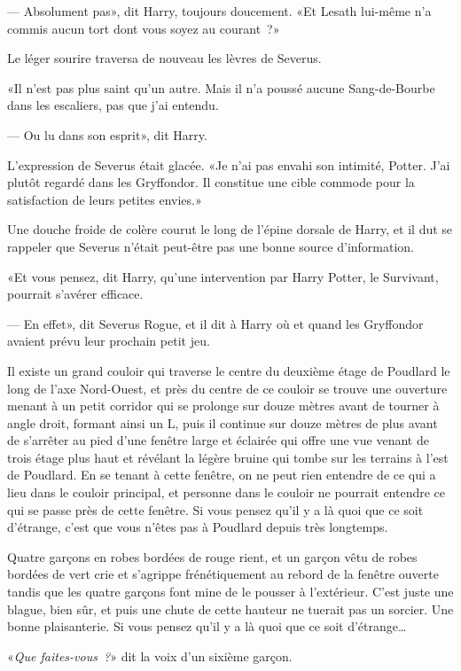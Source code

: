 --- Absolument pas», dit Harry, toujours doucement. «Et Lesath lui-même n'a commis aucun tort dont vous soyez au courant~?»

Le léger sourire traversa de nouveau les lèvres de Severus.

«Il n'est pas plus saint qu'un autre. Mais il n'a poussé aucune Sang-de-Bourbe dans les escaliers, pas que j'ai entendu.

--- Ou lu dans son esprit», dit Harry.

L'expression de Severus était glacée. «Je n'ai pas envahi son intimité, Potter. J'ai plutôt regardé dans les Gryffondor. Il constitue une cible commode pour la satisfaction de leurs petites envies.»

Une douche froide de colère courut le long de l'épine dorsale de Harry, et il dut se rappeler que Severus n'était peut-être pas une bonne source d'information.

«Et vous pensez, dit Harry, qu'une intervention par Harry Potter, le Survivant, pourrait s'avérer efficace.

--- En effet», dit Severus Rogue, et il dit à Harry où et quand les Gryffondor avaient prévu leur prochain petit jeu.

\later

Il existe un grand couloir qui traverse le centre du deuxième étage de Poudlard le long de l'axe Nord-Ouest, et près du centre de ce couloir se trouve une ouverture menant à un petit corridor qui se prolonge sur douze mètres avant de tourner à angle droit, formant ainsi un L, puis il continue sur douze mètres de plus avant de s'arrêter au pied d'une fenêtre large et éclairée qui offre une vue venant de trois étage plus haut et révélant la légère bruine qui tombe sur les terrains à l'est de Poudlard. En se tenant à cette fenêtre, on ne peut rien entendre de ce qui a lieu dans le couloir principal, et personne dans le couloir ne pourrait entendre ce qui se passe près de cette fenêtre. Si vous pensez qu'il y a là quoi que ce soit d'étrange, c'est que vous n'êtes pas à Poudlard depuis très longtemps.

Quatre garçons en robes bordées de rouge rient, et un garçon vêtu de robes bordées de vert crie et s'agrippe frénétiquement au rebord de la fenêtre ouverte tandis que les quatre garçons font mine de le pousser à l'extérieur. C'est juste une blague, bien sûr, et puis une chute de cette hauteur ne tuerait pas un sorcier. Une bonne plaisanterie. Si vous pensez qu'il y a là quoi que ce soit d'étrange…

«\emph{Que faites-vous~?}» dit la voix d'un sixième garçon.

